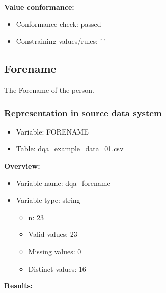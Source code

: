 \documentclass[
]{article}
\providecommand{\tightlist}{%
  \setlength{\itemsep}{0pt}\setlength{\parskip}{0pt}}
\begin{document}
\textbf{Value conformance:}

\begin{itemize}
\tightlist
\item
  Conformance check: passed
\item
  Constraining values/rules: '\,'
\end{itemize}

\newpage

\hypertarget{forename}{%
\subsection{Forename}\label{forename}}

The Forename of the person.

\hypertarget{representation-in-source-data-system-6}{%
\subsubsection{\texorpdfstring{Representation in \textbf{source} data
system}{Representation in source data system}}\label{representation-in-source-data-system-6}}

\begin{itemize}
\tightlist
\item
  Variable: FORENAME
\item
  Table: dqa\_example\_data\_01.csv
\end{itemize}

\textbf{Overview:}

\begin{itemize}
\tightlist
\item
  Variable name: dqa\_forename
\item
  Variable type: string

  \begin{itemize}
  \tightlist
  \item
    n: 23
  \item
    Valid values: 23
  \item
    Missing values: 0
  \item
    Distinct values: 16
  \end{itemize}
\end{itemize}

\textbf{Results:}\\
\end{document}
